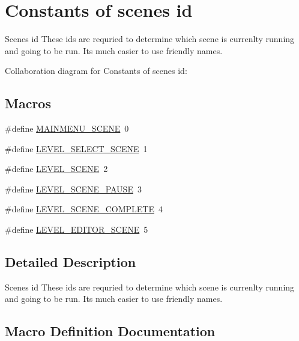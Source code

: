 \hypertarget{group___c}{}\section{Constants of scenes id}
\label{group___c}


Scenes id These ids are requried to determine which scene is currenlty running and going to be run. It\textquotesingle{}s much easier to use friendly names.  


Collaboration diagram for Constants of scenes id\+:
\subsection*{Macros}
\begin{DoxyCompactItemize}
\item 
\#define \hyperlink{group___c_gab816c4e51d50463081105f6bac1f334e}{M\+A\+I\+N\+M\+E\+N\+U\+\_\+\+S\+C\+E\+NE}~0
\item 
\#define \hyperlink{group___c_ga7c624a5bdde49f9ecfe0bffe1b0590f2}{L\+E\+V\+E\+L\+\_\+\+S\+E\+L\+E\+C\+T\+\_\+\+S\+C\+E\+NE}~1
\item 
\#define \hyperlink{group___c_ga8174122322f40f70f3f86a0b591a6bfc}{L\+E\+V\+E\+L\+\_\+\+S\+C\+E\+NE}~2
\item 
\#define \hyperlink{group___c_gaeada4e626f47261a732346e3f3f27e89}{L\+E\+V\+E\+L\+\_\+\+S\+C\+E\+N\+E\+\_\+\+P\+A\+U\+SE}~3
\item 
\#define \hyperlink{group___c_ga56eea14bfd46e3f63aa5301987317b8e}{L\+E\+V\+E\+L\+\_\+\+S\+C\+E\+N\+E\+\_\+\+C\+O\+M\+P\+L\+E\+TE}~4
\item 
\#define \hyperlink{group___c_gae1fd7596d3213753209782f52841431f}{L\+E\+V\+E\+L\+\_\+\+E\+D\+I\+T\+O\+R\+\_\+\+S\+C\+E\+NE}~5
\end{DoxyCompactItemize}


\subsection{Detailed Description}
Scenes id These ids are requried to determine which scene is currenlty running and going to be run. It\textquotesingle{}s much easier to use friendly names. 



\subsection{Macro Definition Documentation}
\mbox{\label{group___c_gae1fd7596d3213753209782f52841431f}} 
